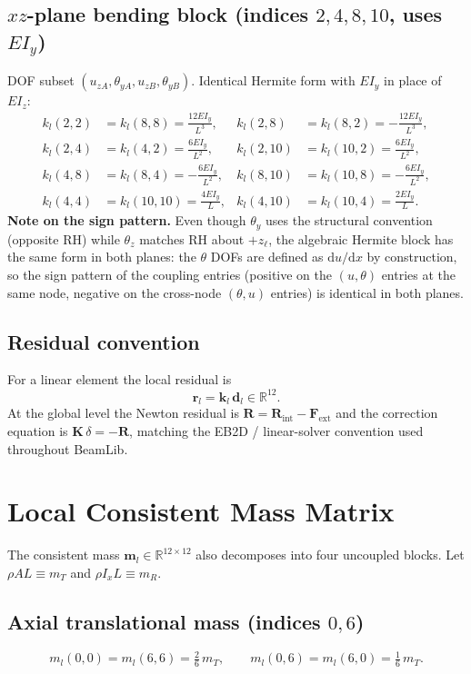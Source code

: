 \documentclass[11pt,a4paper]{article}
\newcommand{\dd}{\mathrm{d}}
\newcommand{\bmath}[1]{\boldsymbol{#1}}
\begin{document}
\subsection{$xz$-plane bending block (indices $2, 4, 8, 10$, uses $E I_y$)}
DOF subset $(u_{zA}, \theta_{yA}, u_{zB}, \theta_{yB})$. Identical Hermite form with $E I_y$ in place of $E I_z$:
\begin{align*}
k_l(2,2) &= k_l(8,8) = \tfrac{12 E I_y}{L^3},   & k_l(2,8)  &= k_l(8,2)  = -\tfrac{12 E I_y}{L^3}, \\
k_l(2,4) &= k_l(4,2) = \tfrac{6 E I_y}{L^2},    & k_l(2,10) &= k_l(10,2) =  \tfrac{6 E I_y}{L^2}, \\
k_l(4,8) &= k_l(8,4) = -\tfrac{6 E I_y}{L^2},   & k_l(8,10) &= k_l(10,8) = -\tfrac{6 E I_y}{L^2}, \\
k_l(4,4) &= k_l(10,10) = \tfrac{4 E I_y}{L},    & k_l(4,10) &= k_l(10,4) =  \tfrac{2 E I_y}{L}.
\end{align*}
\textbf{Note on the sign pattern.} Even though $\theta_y$ uses the structural convention (opposite RH) while $\theta_z$ matches RH about $+\hat{z}_\ell$, the algebraic Hermite block has the same form in both planes: the $\theta$ DOFs are defined as $\dd u/\dd x$ by construction, so the sign pattern of the coupling entries (positive on the $(u, \theta)$ entries at the same node, negative on the cross-node $(\theta, u)$ entries) is identical in both planes.

\subsection{Residual convention}

For a linear element the local residual is
\[
\bmath{r}_l = \bmath{k}_l\,\bmath{d}_l \in \mathbb{R}^{12}.
\]
At the global level the Newton residual is $\bmath{R} = \bmath{R}_{\mathrm{int}} - \bmath{F}_{\mathrm{ext}}$ and the correction equation is $\bmath{K}\,\delta = -\bmath{R}$, matching the EB2D / linear-solver convention used throughout BeamLib.

\section{Local Consistent Mass Matrix}\label{sec:mass}

The consistent mass $\bmath{m}_l \in \mathbb{R}^{12 \times 12}$ also decomposes into four uncoupled blocks. Let $\rho A L \equiv m_T$ and $\rho I_x L \equiv m_R$.

\subsection{Axial translational mass (indices $0, 6$)}
\[
m_l(0,0) = m_l(6,6) = \tfrac{2}{6}\,m_T, \qquad m_l(0,6) = m_l(6,0) = \tfrac{1}{6}\,m_T.
\]
\end{document}
